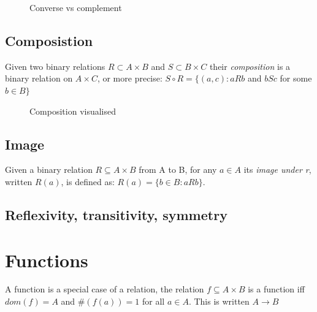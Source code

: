\documentclass[12pt]{article} %
\begin{document}
\begin{figure}[H]
\caption{Converse vs complement}
\label{Converse vs complement}
\end{figure}

\subsection{Composistion}
Given two binary relations $R \subset A \times B$ and $S \subset B \times C$ their \textit{composition} is a binary relation on $A \times C$, or more precise: $S \circ R = \{(a,c) : aRb$ and $bSc$ for some $b \in B\}$ 


\begin{figure}[H]
\caption{Composition visualised}
\label{Composition visualised}
\end{figure}

\subsection{Image}

Given a binary relation $R \subseteq A \times B$ from A to B, for any $a \in A$ its \textit{image under r}, written $R(a)$, is defined as: $R(a) = \{b \in B : aRb\}$. 

\subsection{Reflexivity, transitivity, symmetry}

\section{Functions}
A function is a special case of a relation, the relation $f \subseteq A \times B$ is a function iff $dom(f) = A$ and $\#(f(a)) = 1$ for all $a \in A$. This is written $A \rightarrow B$
\end{document}
